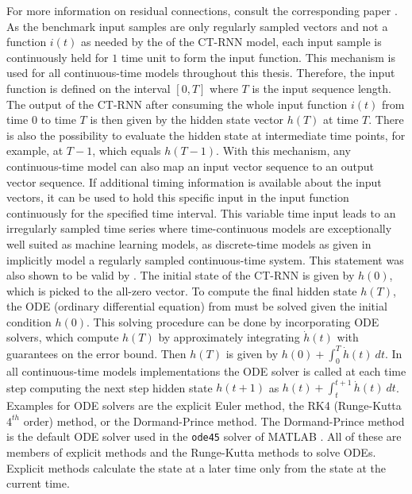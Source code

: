 \documentclass[draft,final]{vutinfth} %
\begin{document}
    For more information on residual connections, consult the corresponding paper \cite{ResNet}.
    As the benchmark input samples are only regularly sampled vectors and not a function $i(t)$ as needed by the  of the CT-RNN model, each input sample is continuously held for $1$ time unit to form the input function.
    This mechanism is used for all continuous-time models throughout this thesis.
    Therefore, the input function is defined on the interval $[0, T]$ where $T$ is the input sequence length.
    The output of the CT-RNN after consuming the whole input function $i(t)$ from time $0$ to time $T$ is then given by the hidden state vector $h(T)$ at time $T$.
    There is also the possibility to evaluate the hidden state at intermediate time points, for example, at $T-1$, which equals $h(T-1)$.
    With this mechanism, any continuous-time model can also map an input vector sequence to an output vector sequence.
    If additional timing information is available about the input vectors, it can be used to hold this specific input in the input function continuously for the specified time interval.
    This variable time input leads to an irregularly sampled time series where time-continuous models are exceptionally well suited as machine learning models, as discrete-time models as given in  implicitly model a regularly sampled continuous-time system.
    This statement was also shown to be valid by \cite{ODELSTM}.
    The initial state of the CT-RNN is given by $h(0)$, which is picked to the all-zero vector.
    To compute the final hidden state $h(T)$, the ODE (ordinary differential equation) from  must be solved given the initial condition $h(0)$.
    This solving procedure can be done by incorporating ODE solvers, which compute $h(T)$ by approximately integrating $\dot h(t)$ with guarantees on the error bound.
    Then $h(T)$ is given by $h(0) + \int_0^T{\dot h(t)}~dt$.
    In all continuous-time models implementations the ODE solver is called at each time step computing the next step hidden state $h(t+1)$ as $h(t) + \int_t^{t+1}{\dot h(t)}~dt$.
    Examples for ODE solvers are the explicit Euler method, the RK4 (Runge-Kutta $4^{th}$ order) method, or the Dormand-Prince method.
    The Dormand-Prince method is the default ODE solver used in the \texttt{ode45} solver of MATLAB \cite{MATLAB}.
    All of these are members of explicit methods and the Runge-Kutta methods to solve ODEs. Explicit methods calculate the state at a later time only from the state at the current time.
\end{document}
